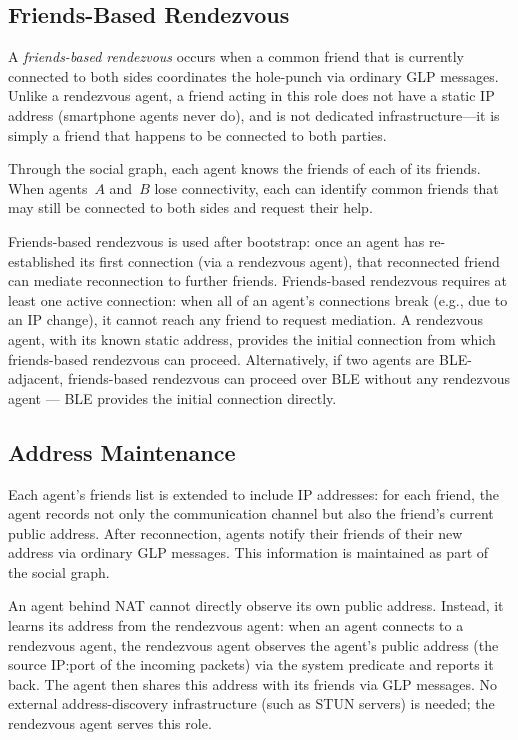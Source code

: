 \subsection{Friends-Based Rendezvous}
\label{sec:friends-based-rv}
A \emph{friends-based rendezvous} occurs when a common friend that is currently connected to both sides coordinates the hole-punch via ordinary GLP messages.  Unlike a rendezvous agent, a friend acting in this role does not have a static IP address (smartphone agents never do), and is not dedicated infrastructure---it is simply a friend that happens to be connected to both parties.

Through the social graph, each agent knows the friends of each of its friends.  When agents~$A$ and~$B$ lose connectivity, each can identify common friends that may still be connected to both sides and request their help.

Friends-based rendezvous is used after bootstrap: once an agent has re-established its first connection (via a rendezvous agent), that reconnected friend can mediate reconnection to further friends.  Friends-based rendezvous requires at least one active connection: when all of an agent's connections break (e.g., due to an IP change), it cannot reach any friend to request mediation.  A rendezvous agent, with its known static address, provides the initial connection from which friends-based rendezvous can proceed.  Alternatively, if two agents are BLE-adjacent, friends-based rendezvous can proceed over BLE without any rendezvous agent --- BLE provides the initial connection directly.

\subsection{Address Maintenance}
\label{sec:addr-maintenance}
Each agent's friends list is extended to include IP addresses: for each friend, the agent records not only the communication channel but also the friend's current public address.  After reconnection, agents notify their friends of their new address via ordinary GLP messages.  This information is maintained as part of the social graph.

An agent behind NAT cannot directly observe its own public address.  Instead, it learns its address from the rendezvous agent: when an agent connects to a rendezvous agent, the rendezvous agent observes the agent's public address (the source IP:port of the incoming packets) via the  system predicate and reports it back.  The agent then shares this address with its friends via GLP messages.  No external address-discovery infrastructure (such as STUN servers) is needed; the rendezvous agent serves this role.

